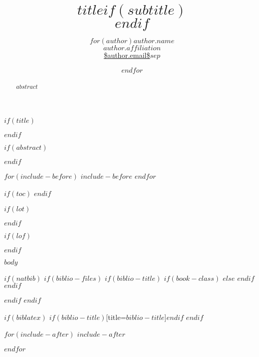 \documentclass[article,11pt,oneside]{article}
\title{$title$$if(subtitle)$\\\vspace{0.5em}{\large $subtitle$}$endif$}
\author{$for(author)$\normalsize $author.name$\vspace{0.05in} \\
        \normalsize{$author.affiliation$} \\
        \normalsize \url{$author.email$}\vspace*{0.2in}\newline $sep$ \and $endfor$}
\date{}
\begin{document}
$if(title)$
    \maketitle
$endif$

$if(abstract)$
    \begin{abstract}
    $abstract$
    \end{abstract}
$endif$

$for(include-before)$
    $include-before$
$endfor$

$if(toc)$
    {
    \hypersetup{linkcolor=black}
    \setcounter{tocdepth}{$toc-depth$}
    \tableofcontents
    }
$endif$

$if(lot)$
    \listoftables
$endif$

$if(lof)$
    \listoffigures
$endif$

$body$

$if(natbib)$
    $if(biblio-files)$
        $if(biblio-title)$
            $if(book-class)$
                \renewcommand\bibname{$biblio-title$}
            $else$
                \renewcommand\refname{$biblio-title$}
            $endif$
        $endif$
        
    $endif$
$endif$

$if(biblatex)$
    \printbibliography$if(biblio-title)$[title=$biblio-title$]$endif$
$endif$

$for(include-after)$
$include-after$

$endfor$
\end{document}
